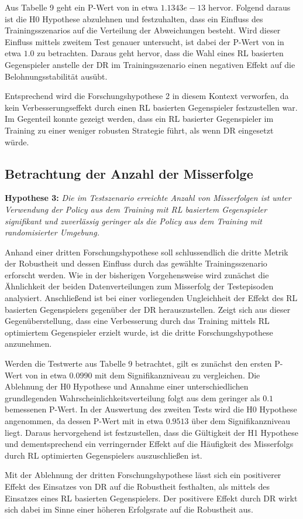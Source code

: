 Aus Tabelle 9 geht ein P-Wert von in etwa $1.1343e-13$ hervor.
Folgend daraus ist die H0 Hypothese abzulehnen und festzuhalten, dass ein Einfluss des Trainingsszenarios auf die Verteilung der Abweichungen besteht.
Wird dieser Einfluss mittels zweitem Test genauer untersucht, ist dabei der P-Wert von in etwa $1.0$ zu betrachten.
Daraus geht hervor, dass die Wahl eines RL basierten Gegenspieler anstelle der DR im Trainingsszenario einen negativen Effekt auf die Belohnungsstabilität ausübt.

Entsprechend wird die Forschungshypothese 2 in diesem Kontext verworfen, da kein Verbesserungseffekt durch einen RL basierten Gegenspieler festzustellen war.
Im Gegenteil konnte gezeigt werden, dass ein RL basierter Gegenspieler im Training zu einer weniger robusten Strategie führt, als wenn DR eingesetzt würde.

\subsection{Betrachtung der Anzahl der Misserfolge}

\textbf{Hypothese 3:}
\textit{Die im Testszenario erreichte Anzahl von Misserfolgen ist unter Verwendung der Policy aus dem Training mit RL basiertem Gegenspieler signifikant und zuverlässig geringer als die Policy aus dem Training mit randomisierter Umgebung.}

Anhand einer dritten Forschungshypothese soll schlussendlich die dritte Metrik der Robustheit und dessen Einfluss durch das gewählte Trainingsszenario erforscht werden.
Wie in der bisherigen Vorgehensweise wird zunächst die Ähnlichkeit der beiden Datenverteilungen zum Misserfolg der Testepisoden analysiert.
Anschließend ist bei einer vorliegenden Ungleichheit der Effekt des RL basierten Gegenspielers gegenüber der DR herauszustellen.
Zeigt sich aus dieser Gegenüberstellung, dass eine Verbesserung durch das Training mittels RL optimiertem Gegenspieler erzielt wurde, ist die dritte Forschungshypothese anzunehmen. 

Werden die Testwerte aus Tabelle 9 betrachtet, gilt es zunächst den ersten P-Wert von in etwa $0.0990$ mit dem Signifikanzniveau zu vergleichen.
Die Ablehnung der H0 Hypothese und Annahme einer unterschiedlichen grundlegenden Wahrscheinlichkeitsverteilung folgt aus dem geringer als $0.1$ bemessenen P-Wert.
In der Auswertung des zweiten Tests wird die H0 Hypothese angenommen, da dessen P-Wert mit in etwa $0.9513$ über dem Signifikanzniveau liegt.
Daraus hervorgehend ist festzustellen, dass die Gültigkeit der H1 Hypothese und dementsprechend ein verringernder Effekt auf die Häufigkeit des Misserfolgs durch RL optimierten Gegenspielers auszuschließen ist.

Mit der Ablehnung der dritten Forschungshypothese lässt sich ein positiverer Effekt des Einsatzes von DR auf die Robustheit festhalten, als mittels des Einsatzes eines RL basierten Gegenspielers.
Der positivere Effekt durch DR wirkt sich dabei im Sinne einer höheren Erfolgsrate auf die Robustheit aus.